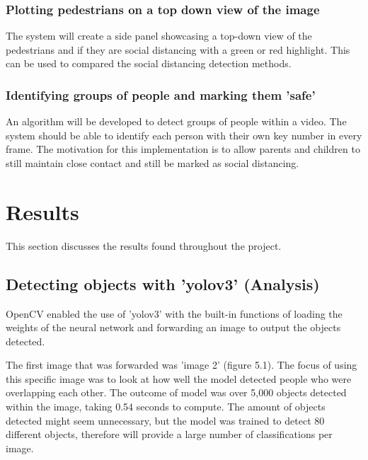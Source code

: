 \documentclass[12pt]{report}
\begin{document}
\subsection*{Plotting pedestrians on a top down view of the image}

The system will create a side panel showcasing a top-down view of the pedestrians and if they are social distancing with a green or red highlight. This can be used to compared the social distancing detection methods.

\subsection*{Identifying groups of people and marking them 'safe'}

An algorithm will be developed to detect groups of people within a video. The system should be able to identify each person with their own key number in every frame. The motivation for this implementation is to allow parents and children to still maintain close contact and still be marked as social distancing.

\chapter{Results}

This section discusses the results found throughout the project.

\section{Detecting objects with 'yolov3' (Analysis)}

OpenCV enabled the use of 'yolov3' with the built-in functions of loading the weights of the neural network and forwarding an image to output the objects detected. 

\vspace{2mm}

The first image that was forwarded was 'image 2' (figure 5.1). The focus of using this specific image was to look at how well the model detected people who were overlapping each other. The outcome of model was over 5,000 objects detected within the image, taking 0.54 seconds to compute. The amount of objects detected might seem unnecessary, but the model was trained to detect 80 different objects, therefore will provide a large number of classifications per image.

\vspace{2mm}
\end{document}

